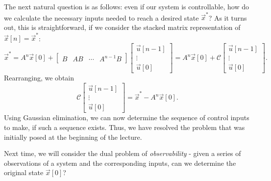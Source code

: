 \documentclass[letterpaper]{article}
\theoremstyle{remark}
\newcommand{\mat}[1]{\ensuremath{\begin{bmatrix}#1\end{bmatrix}}}
\begin{document}
The next natural question is as follows: even if our system is controllable, how do we calculate the necessary inputs needed to reach a desired state $\vec{x}^*$? As it turns out, this is straightforward, if we consider the stacked matrix representation of $\vec{x}[n] = \vec{x}^*$:
\[
    \vec{x}^* = A^n\vec{x}[0] + \mat{B & AB & \cdots & A^{n - 1}B} \mat{\vec{u}[n - 1] \\ \vdots \\ \vec{u}[0]} = A^n\vec{x}[0] + \mathscr{C}\mat{\vec{u}[n - 1] \\ \vdots \\ \vec{u}[0]}.
\]
Rearranging, we obtain
\[
    \mathscr{C}\mat{\vec{u}[n - 1] \\ \vdots \\ \vec{u}[0]} = \vec{x}^* - A^n\vec{x}[0].
\]
Using Gaussian elimination, we can now determine the sequence of control inputs to make, if such a sequence exists. Thus, we have resolved the problem that was initially posed at the beginning of the lecture.

Next time, we will consider the dual problem of \emph{observability} - given a series of observations of a system and the corresponding inputs, can we determine the original state $\vec{x}[0]$?
\end{document}
